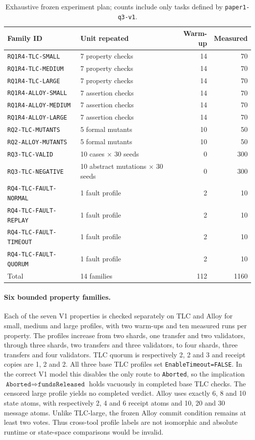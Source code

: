 \begin{table}[htbp]
\centering
\scriptsize
\setlength{\tabcolsep}{3pt}
\caption{Exhaustive frozen experiment plan; counts include only tasks defined
by \texttt{paper1-q3-v1}.}
\label{tab:family-detail}
\begin{tabular}{@{}llrr@{}}
\hline
Family ID & Unit repeated & Warm-up & Measured \\
\hline
\texttt{RQ1R4-TLC-SMALL} & 7 property checks & 14 & 70 \\
\texttt{RQ1R4-TLC-MEDIUM} & 7 property checks & 14 & 70 \\
\texttt{RQ1R4-TLC-LARGE} & 7 property checks & 14 & 70 \\
\texttt{RQ1R4-ALLOY-SMALL} & 7 assertion checks & 14 & 70 \\
\texttt{RQ1R4-ALLOY-MEDIUM} & 7 assertion checks & 14 & 70 \\
\texttt{RQ1R4-ALLOY-LARGE} & 7 assertion checks & 14 & 70 \\
\texttt{RQ2-TLC-MUTANTS} & 5 formal mutants & 10 & 50 \\
\texttt{RQ2-ALLOY-MUTANTS} & 5 formal mutants & 10 & 50 \\
\texttt{RQ3-TLC-VALID} & 10 cases $\times$ 30 seeds & 0 & 300 \\
\texttt{RQ3-TLC-NEGATIVE} & 10 abstract mutations $\times$ 30 seeds & 0 & 300 \\
\texttt{RQ4-TLC-FAULT-NORMAL} & 1 fault profile & 2 & 10 \\
\texttt{RQ4-TLC-FAULT-REPLAY} & 1 fault profile & 2 & 10 \\
\texttt{RQ4-TLC-FAULT-TIMEOUT} & 1 fault profile & 2 & 10 \\
\texttt{RQ4-TLC-FAULT-QUORUM} & 1 fault profile & 2 & 10 \\
\hline
Total & 14 families & 112 & 1160 \\
\hline
\end{tabular}
\end{table}

\paragraph{Six bounded property families.}
Each of the seven V1 properties is checked separately on TLC and Alloy for
small, medium and large profiles, with two warm-ups and ten measured runs per
property. The profiles increase from two shards, one transfer and two
validators, through three shards, two transfers and three validators, to
four shards, three transfers and four validators. TLC quorum is respectively
2, 2 and 3 and receipt copies are 1, 2 and 2. All three base TLC profiles set
\texttt{EnableTimeout=FALSE}. In the correct V1 model this disables the only
route to \texttt{Aborted}, so the implication
\(\texttt{Aborted}\Rightarrow\texttt{fundsReleased}\) holds vacuously in
completed base TLC checks. The censored large profile yields no completed
verdict. Alloy uses exactly 6, 8 and 10
state atoms, with respectively 2, 4 and 6 receipt atoms and 10, 20 and 30
message atoms. Unlike TLC-large, the frozen Alloy commit condition remains
at least two votes. Thus cross-tool profile labels are not isomorphic and
absolute runtime or state-space comparisons would be invalid.


